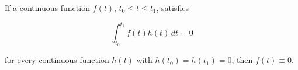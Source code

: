 If a continuous function $f(t)$, $t_0 \leq t \leq t_1$, satisfies

$$\int_{t_0}^{t_1} f(t) h(t)\, dt = 0$$

for every continuous function $h(t)$ with $h(t_0) = h(t_1) = 0$, then $f(t) \equiv 0$.
